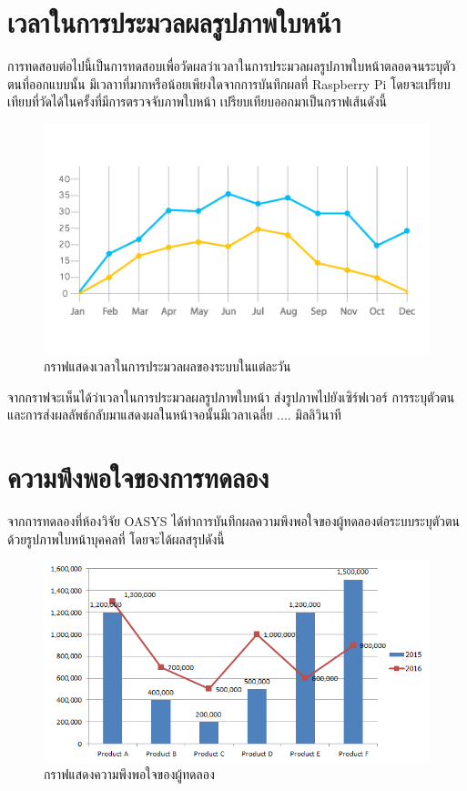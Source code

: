 \section{เวลาในการประมวลผลรูปภาพใบหน้า}
การทดสอบต่อไปนี้เป็นการทดสอบเพื่อวัดผลว่าเวลาในการประมวลผลรูปภาพใบหน้าตลอดจนระบุตัวตนที่ออกแบบนั้น
มีเวลาาที่มากหรือน้อยเพียงใดจากการบันทึกผลที่ Raspberry Pi โดยจะเปรียบเทียบที่วัดได้ในครั้งที่มีการตรวจจับภาพใบหน้า
เปรียบเทียบออกมาเป็นกราฟเส้นดังนี้
  
\begin{figure}[!ht]
  \begin{center}
    \includegraphics[scale=.7]{pic/graph_acc.jpg}
    \caption[กราฟแสดงเวลาในการประมวลผลของระบบในแต่ละวัน]{กราฟแสดงเวลาในการประมวลผลของระบบในแต่ละวัน}
    \label{fig:time_graph}
  \end{center}
\end{figure}
\newpage
\indent จากกราฟจะเห็นได้ว่าเวลาในการประมวลผลรูปภาพใบหน้า ส่งรูปภาพไปยังเซิร์ฟเวอร์ การระบุตัวตน และการส่งผลลัพธ์กลับมาแสดงผลในหน้าจอนั้นมีเวลาเฉลี่ย .... มิลลิวินาที



\section{ความพึงพอใจของการทดลอง}
จากการทดลองที่ห้องวิจัย OASYS ได้ทำการบันทึกผลความพึงพอใจของผู้ทดลองต่อระบบระบุตัวตนด้วยรูปภาพใบหน้าบุคคลที่ โดยจะได้ผลสรุปดังนี้

\begin{figure}[!ht]
    \begin{center}
      \includegraphics[scale=.5]{pic/bar_graph.png}
      \caption[กราฟแสดงความพึงพอใจของผู้ทดลอง]{กราฟแสดงความพึงพอใจของผู้ทดลอง}
      \label{fig:bar_graph}
    \end{center}
  \end{figure}
